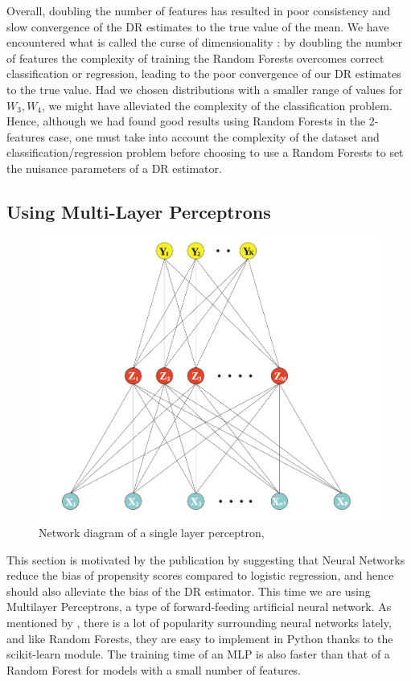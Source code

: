 \documentclass[12pt,twoside]{article}
\begin{document}
Overall, doubling the number of features has resulted in poor consistency and slow convergence of the DR estimates to the true value of the mean. We have encountered what is called the curse of dimensionality \citep{Wasserman2006}: by doubling the number of features the complexity of training the Random Forests overcomes correct classification or regression, leading to the poor convergence of our DR estimates to the true value. Had we chosen distributions with a smaller range of values for $W_3,W_4$, we might have alleviated the complexity of the classification problem. Hence, although we had found good results using Random Forests in the 2-features case, one must take into account the complexity of the dataset and classification/regression problem before choosing to use a Random Forests to set the nuisance parameters of a DR estimator.

\clearpage
\subsection{Using Multi-Layer Perceptrons}
\begin{figure}[h!]
    \centering
    \includegraphics[width = 0.7\columnwidth]{figures/Screenshot 2021-05-26 at 19.21.43.png}
    \caption{Network diagram of a single layer perceptron, \citet{hastieESL}}
    \label{fignn}
\end{figure}

This section is motivated by the publication by \citet{setoguchi-nn} suggesting that Neural Networks reduce the bias of propensity scores compared to logistic regression, and hence should also alleviate the bias of the DR estimator. This time we are using Multilayer Perceptrons, a type of forward-feeding artificial neural network. As mentioned by \citet{hastieESL}, there is a lot of popularity surrounding neural networks lately, and like Random Forests, they are easy to implement in Python thanks to the scikit-learn module. The training time of an MLP is also faster than that of a Random Forest for models with a small number of features. 
\end{document}
